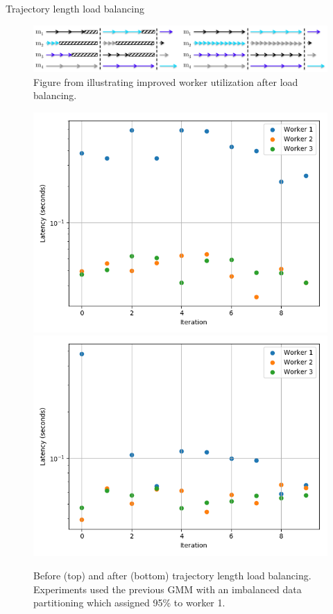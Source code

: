 \documentclass[final]{beamer}
\newlength{\onecolwid}
\newlength{\twocolwid}
\begin{document}
\begin{frame}[t]
\begin{columns}[t]
\begin{column}{\twocolwid}
\begin{columns}[t,totalwidth=\twocolwid]
\begin{column}{\onecolwid}
\begin{block}{Trajectory length load balancing}

  \begin{figure}[htpb]
    \centering
    \includegraphics[width=1.0\linewidth]{poster-figures/ahn-lb.png}
    \caption{Figure from \cite{ahn2014distributed} illustrating improved worker
      utilization after load balancing.}
    \label{fig:ahn-lb}
  \end{figure}

  \begin{figure}
    \includegraphics[width=0.7\linewidth]{poster-figures/load-balancing-none.png}\\
    \includegraphics[width=0.7\linewidth]{poster-figures/load-balancing.png}
    \caption{Before (top) and after (bottom) trajectory length load balancing. Experiments used
      the previous GMM with an imbalanced data partitioning which assigned 95\% to worker 1.}
    \label{fig:load-balancing}
  \end{figure}


\end{block}
\end{column}
\end{columns}
\end{column}
\end{columns}
\end{frame}
\end{document}
